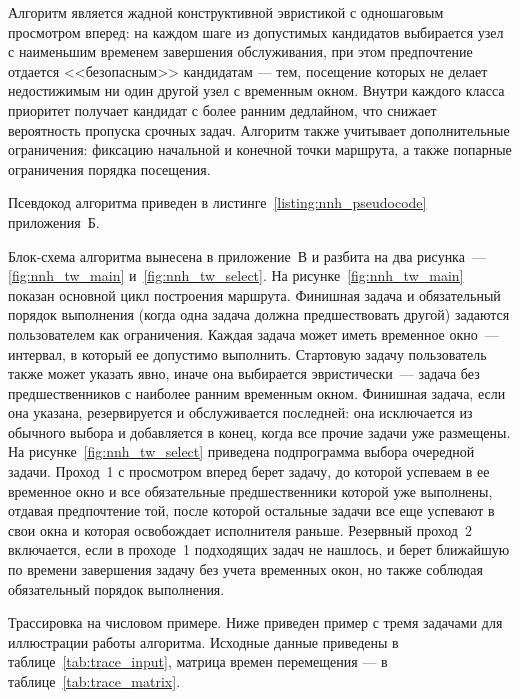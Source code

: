 Алгоритм является жадной конструктивной эвристикой с одношаговым просмотром
вперед: на каждом шаге из допустимых кандидатов выбирается
узел с наименьшим временем завершения обслуживания, при этом предпочтение
отдается <<безопасным>> кандидатам --- тем, посещение которых не делает
недостижимым ни один другой узел с временным окном. Внутри каждого класса
приоритет получает кандидат с более ранним
дедлайном, что снижает вероятность пропуска срочных задач.
Алгоритм также учитывает дополнительные ограничения: фиксацию начальной
и конечной точки маршрута, а также попарные ограничения порядка посещения.

Псевдокод алгоритма приведен в листинге~\ref{listing:nnh_pseudocode} приложения~Б.

Блок-схема алгоритма вынесена в приложение~В и разбита на два рисунка~---
\ref{fig:nnh_tw_main} и~\ref{fig:nnh_tw_select}. На
рисунке~\ref{fig:nnh_tw_main} показан основной цикл построения маршрута.
Финишная задача и обязательный порядок выполнения (когда одна задача
должна предшествовать другой) задаются пользователем как ограничения.
Каждая задача может иметь временное окно~--- интервал, в который ее
допустимо выполнить. Стартовую задачу пользователь также может указать явно, иначе она
выбирается эвристически~--- задача без предшественников с наиболее ранним
временным окном. Финишная задача, если она указана, резервируется и
обслуживается последней: она исключается из обычного выбора и
добавляется в конец, когда все прочие задачи уже размещены. На рисунке~\ref{fig:nnh_tw_select}
приведена подпрограмма выбора очередной задачи. Проход~1 с просмотром
вперед берет задачу, до которой успеваем в ее временное окно и все
обязательные предшественники которой уже выполнены, отдавая предпочтение
той, после которой остальные задачи все еще успевают в свои окна и
которая освобождает исполнителя раньше. Резервный проход~2 включается,
если в проходе~1 подходящих задач не нашлось, и берет ближайшую по
времени завершения задачу без учета временных окон, но также соблюдая
обязательный порядок выполнения.

Трассировка на числовом примере. Ниже приведен пример с тремя задачами для иллюстрации работы алгоритма.
Исходные данные приведены в таблице~\ref{tab:trace_input},
матрица времен перемещения — в таблице~\ref{tab:trace_matrix}.

